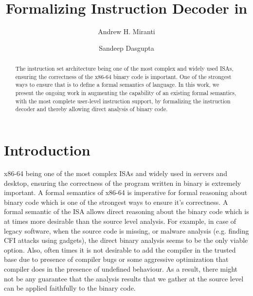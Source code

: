 \documentclass[a4paper,UKenglish,cleveref, autoref]{lipics-v2019}
\title{Formalizing \ISA Instruction Decoder in \K} %
\author{Andrew H. Miranti}{University of Illinois at Urbana Champaign, USA}{miranti2@illinois.edu}{}{}
\author{Sandeep Dasgupta}{University of Illinois at Urbana Champaign, USA \and \url{http://sdasgup3.web.engr.illinois.edu} }{sdasgup3@illinois.edu}{}{}
\begin{document}
\maketitle

\begin{abstract}
    The \ISA instruction set architecture being one of the
    most complex and widely used ISAs,  ensuring the correctness of the x86-64 binary code is
    important. One of the strongest ways to ensure that is to define a  formal semantics of \ISA language. In this work, we present the ongoing work in augmenting the capability of an existing \ISA formal semantics, with the most complete user-level instruction support, by formalizing the instruction decoder and thereby allowing direct analysis of binary code.
\end{abstract}

\section{Introduction}
\label{sec:intro}
x86-64 being one of the most complex ISAs and widely used in servers and desktop, ensuring the correctness of the program written in binary is extremely important. A formal semantics of x86-64 is imperative for formal reasoning about binary code which is  one of the strongest ways to ensure it's correctness. A formal semantic of the ISA allows direct reasoning about the binary code which is at times more desirable than the source level analysis. For example, in case of legacy software, when the source code is missing, or malware analysis (e.g. finding CFI attacks using gadgets), the direct binary analysis seems to be the only viable option.  Also, often times it is not desirable to add the compiler in the trusted base due to presence of compiler bugs or some aggressive optimization that compiler does in the presence of undefined behaviour. As a result, there might not be any guarantee that the analysis results that we gather at the source level  can be applied faithfully to the binary code.  
\end{document}
